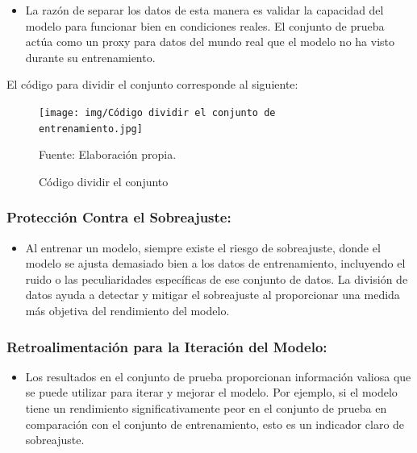 \begin{itemize}
    \item La razón de separar los datos de esta manera es validar la capacidad del modelo para funcionar bien en condiciones reales. El conjunto de prueba actúa como un proxy para datos del mundo real que el modelo no ha visto durante su entrenamiento.
\end{itemize}

El código para dividir el conjunto corresponde al siguiente:

\begin{figure}[H]
    \begin{minipage}[t]{0.9\textwidth}
        \caption{Código dividir el conjunto}
        \label{dividir_conjunto}        
    \end{minipage}

    \vspace{10pt}

    \begin{minipage}[b]{1\textwidth}
        \centering
        \texttt{[image: img/Código dividir el conjunto de entrenamiento.jpg]}        
    \end{minipage}

    \begin{minipage}[t]{0.9\textwidth}
        Fuente: Elaboración propia.
    \end{minipage}
\end{figure}

\subsubsection{Protección Contra el Sobreajuste:}

\begin{itemize}
    \item Al entrenar un modelo, siempre existe el riesgo de sobreajuste, donde el modelo se ajusta demasiado bien a los datos de entrenamiento, incluyendo el ruido o las peculiaridades específicas de ese conjunto de datos. La división de datos ayuda a detectar y mitigar el sobreajuste al proporcionar una medida más objetiva del rendimiento del modelo.
\end{itemize}

\subsubsection{Retroalimentación para la Iteración del Modelo:}

\begin{itemize}
    \item Los resultados en el conjunto de prueba proporcionan información valiosa que se puede utilizar para iterar y mejorar el modelo. Por ejemplo, si el modelo tiene un rendimiento significativamente peor en el conjunto de prueba en comparación con el conjunto de entrenamiento, esto es un indicador claro de sobreajuste.
\end{itemize}

